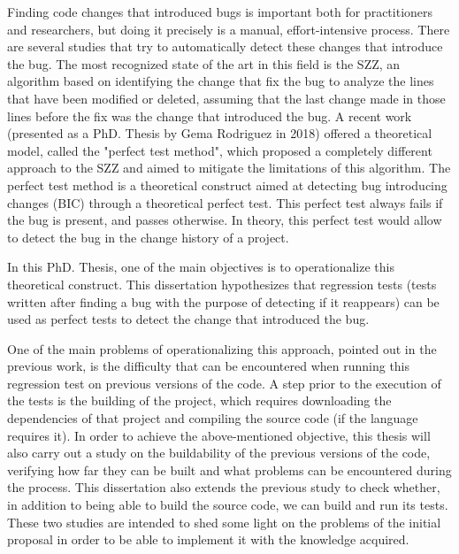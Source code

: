 Finding code changes that introduced bugs is important both for practitioners and researchers, but doing it precisely is a manual, effort-intensive process.
There are several studies that try to automatically detect these changes that introduce the bug. 
The most recognized state of the art in this field is the SZZ, an algorithm based on identifying the change that fix the bug to analyze the lines that have been modified or deleted, assuming that the last change made in those lines before the fix was the change that introduced the bug. 
A recent work (presented as a PhD. Thesis by Gema Rodriguez in 2018) offered a theoretical model, called the "perfect test method", which proposed a completely different approach to the SZZ and aimed to mitigate the limitations of this algorithm. 
The perfect test method is a theoretical construct aimed at detecting bug introducing changes (BIC) through a theoretical perfect test. This perfect test always fails if the bug is present, and passes otherwise.
In theory, this perfect test would allow to detect the bug in the change history of a project.

In this PhD. Thesis, one of the main objectives is to operationalize this theoretical construct. 
This dissertation hypothesizes that regression tests (tests written after finding a bug with the purpose of detecting if it reappears) can be used as perfect tests to detect the change that introduced the bug. 

One of the main problems of operationalizing this approach, pointed out in the previous work, is the difficulty that can be encountered when running this regression test on previous versions of the code. 
A step prior to the execution of the tests is the building of the project, which requires downloading the dependencies of that project and compiling the source code (if the language requires it). 
In order to achieve the above-mentioned objective, this thesis will also carry out a study on the buildability of the previous versions of the code, verifying how far they can be built and what problems can be encountered during the process.
This dissertation also extends the previous study to check whether, in addition to being able to build the source code, we can build and run its tests. 
These two studies are intended to shed some light on the problems of the initial proposal in order to be able to implement it with the knowledge acquired.

